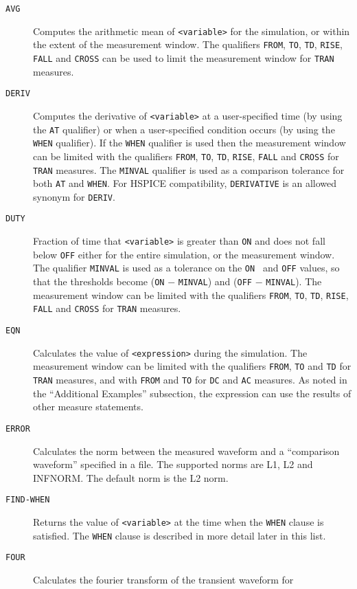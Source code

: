 \begin{Command}
\begin{Arguments}
\begin{description}
  \item[\tt AVG] Computes the arithmetic mean of {\tt <variable>} for the
    simulation, or within the extent of the measurement window.
    The qualifiers {\tt FROM}, {\tt TO}, {\tt TD}, {\tt RISE}, {\tt FALL}
    and {\tt CROSS} can be used to limit the measurement window for {\tt TRAN} measures.
  \item[\tt DERIV] Computes the derivative of {\tt <variable>} at a user-specified
    time (by using the {\tt AT} qualifier) or when a user-specified condition occurs 
    (by using the {\tt WHEN} qualifier). If the {\tt WHEN} qualifier is used then the 
    measurement window can be limited with the qualifiers {\tt FROM}, {\tt TO}, {\tt TD}, 
    {\tt RISE}, {\tt FALL} and {\tt CROSS} for {\tt TRAN} measures. The {\tt MINVAL} qualifier is 
    used as a comparison tolerance for both {\tt AT} and {\tt WHEN}.  For HSPICE compatibility, 
    {\tt DERIVATIVE} is an allowed synonym for {\tt DERIV}.
  \item[\tt DUTY] Fraction of time that {\tt <variable>} is greater than {\tt ON} and
    does not fall below {\tt OFF} either for the entire simulation, or the measurement 
    window. The qualifier {\tt MINVAL} is used as a tolerance on the {\tt ON } and {\tt OFF} 
    values, so that the thresholds become ({\tt ON} $-$ {\tt MINVAL}) and ({\tt OFF} $-$ {\tt MINVAL}).  
    The measurement window can be limited with the qualifiers {\tt FROM}, {\tt TO}, 
    {\tt TD}, {\tt RISE}, {\tt FALL} and {\tt CROSS} for {\tt TRAN} measures. 
  \item[\tt EQN] Calculates the value of {\tt <expression>} during the simulation. The 
    measurement window can be limited with the qualifiers {\tt FROM}, {\tt TO} and {\tt TD}
    for {\tt TRAN} measures, and with {\tt FROM} and {\tt TO} for {\tt DC} and {\tt AC} measures.  
    As noted in the ``Additional Examples'' subsection, the expression can 
    use the results of other measure statements.
  \item[\tt ERROR] Calculates the norm between the measured waveform and a ``comparison
    waveform'' specified in a file.  The supported norms are L1, L2 and INFNORM.  The
    default norm is the L2 norm.  
  \item[\tt FIND-WHEN] Returns the value of {\tt <variable>} at the time when the {\tt WHEN} clause
    is satisfied.  The {\tt WHEN} clause is described in more detail later in this list.  
  \item[\tt FOUR] Calculates the fourier transform of the transient waveform for

\end{description}
\end{Arguments}
\end{Command}
